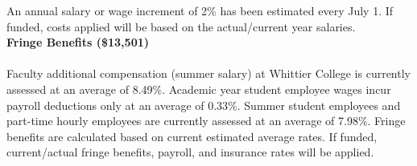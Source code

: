 \documentclass[11pt]{amsart}
\begin{document}
\noindent
An annual salary or wage increment of 2\% has been estimated every July 1. If funded, costs applied will be based on the actual/current year salaries. \\

\noindent
\textbf{Fringe Benefits (\$13,501)} \\ \\
Faculty additional compensation (summer salary) at Whittier College is currently assessed at an average of 8.49\%. Academic year student employee wages incur payroll deductions only at an average of 0.33\%. Summer student employees and part-time hourly employees are currently assessed at an average of 7.98\%. Fringe benefits are calculated based on current estimated average rates. If funded, current/actual fringe benefits, payroll, and insurance rates will be applied. \\
\end{document}
